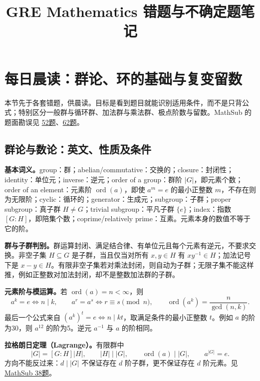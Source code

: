 \documentclass[11pt,a4paper,fontset=fandol]{ctexart}
\title{GRE Mathematics 错题与不确定题笔记}
\author{}
\date{}
\begin{document}
\maketitle
\tableofcontents
\clearpage

\section{每日晨读：群论、环的基础与复变留数}
\label{review:morning}
本节先于各套错题，供晨读。目标是看到题目就能识别适用条件，而不是只背公式；特别区分一般群与循环群、加法群与乘法群、极点阶数与留数。MathSub 的题面勘误见 \hyperref[ms:q52]{52题}、\hyperref[ms:q62]{62题}。

\subsection{群论与数论：英文、性质及条件}
\label{review:groups}
\textbf{基本词义。}group：群；abelian/commutative：交换的；closure：封闭性；identity：单位元；inverse：逆元；order of a group：群阶 $|G|$，即元素个数；order of an element：元素阶 $\operatorname{ord}(a)$，即使 $a^m=e$ 的最小正整数 $m$，不存在则为无限阶；cyclic：循环的；generator：生成元；subgroup：子群；proper subgroup：真子群 $H\ne G$；trivial subgroup：平凡子群 $\{e\}$；index：指数 $[G:H]$，即陪集个数；coprime/relatively prime：互素。元素本身的数值不等于它的阶。

\textbf{群与子群判别。}群运算封闭、满足结合律、有单位元且每个元素有逆元，不要求交换。非空子集 $H\subseteq G$ 是子群，当且仅当对所有 $x,y\in H$ 有 $xy^{-1}\in H$；加法记号下是 $x-y\in H$。有限非空子集若对乘法封闭，则自动为子群；无限子集不能这样推，例如正整数对加法封闭，却不是整数加法群的子群。

\textbf{元素阶与模运算。}若 $\operatorname{ord}(a)=n<\infty$，则
\begin{equation}
a^k=e\iff n\mid k,\qquad a^r=a^s\iff r\equiv s\pmod n,\qquad
\operatorname{ord}(a^k)=\frac{n}{\gcd(n,k)}.
\label{review:order-power}
\end{equation}
最后一个公式来自 $(a^k)^t=e\iff n\mid kt$，取满足条件的最小正整数 $t$。例如 $a$ 的阶为30，则 $a^{12}$ 的阶为5。逆元 $a^{-1}$ 与 $a$ 的阶相同。

\textbf{拉格朗日定理（Lagrange）。}有限群中
\begin{equation}
|G|=[G:H]|H|,\qquad |H|\mid|G|,\qquad \operatorname{ord}(a)\mid|G|,\qquad a^{|G|}=e.
\label{review:lagrange}
\end{equation}
方向不能反过来：$d\mid|G|$ 不保证存在 $d$ 阶子群，更不保证存在 $d$ 阶元素。见 \hyperref[ms:q38]{MathSub 38题}。
\end{document}
